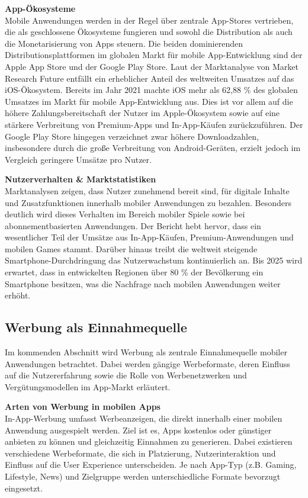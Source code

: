 \textbf{App-Ökosysteme}\\
Mobile Anwendungen werden in der Regel über zentrale App-Stores vertrieben, die als geschlossene Ökosysteme fungieren und sowohl die Distribution als auch die Monetarisierung von Apps steuern. Die beiden dominierenden Distributionsplattformen im globalen Markt für mobile App-Entwicklung sind der Apple App Store und der Google Play Store.
Laut der Marktanalyse von Market Research Future entfällt ein erheblicher Anteil des weltweiten Umsatzes auf das iOS-Ökosystem. Bereits im Jahr 2021 machte iOS mehr als 62,88 \% des globalen Umsatzes im Markt für mobile App-Entwicklung aus. Dies ist vor allem auf die höhere Zahlungsbereitschaft der Nutzer im Apple-Ökosystem sowie auf eine stärkere Verbreitung von Premium-Apps und In-App-Käufen zurückzuführen.
Der Google Play Store hingegen verzeichnet zwar höhere Downloadzahlen, insbesondere durch die große Verbreitung von Android-Geräten, erzielt jedoch im Vergleich geringere Umsätze pro Nutzer. \cite{App_Markt_Entwicklung}

\textbf{Nutzerverhalten \& Marktstatistiken}\\
Marktanalysen zeigen, dass Nutzer zunehmend bereit sind, für digitale Inhalte und Zusatzfunktionen innerhalb mobiler Anwendungen zu bezahlen. Besonders deutlich wird dieses Verhalten im Bereich mobiler Spiele sowie bei abonnementbasierten Anwendungen. Der Bericht hebt hervor, dass ein wesentlicher Teil der Umsätze aus In-App-Käufen, Premium-Anwendungen und mobilen Games stammt.
Darüber hinaus treibt die weltweit steigende Smartphone-Durchdringung das Nutzerwachstum kontinuierlich an. Bis 2025 wird erwartet, dass in entwickelten Regionen über 80 \% der Bevölkerung ein Smartphone besitzen, was die Nachfrage nach mobilen Anwendungen weiter erhöht.\cite{App_Markt_Entwicklung}


\subsection{Werbung als Einnahmequelle}
Im kommenden Abschnitt wird Werbung als zentrale Einnahmequelle mobiler Anwendungen betrachtet. Dabei werden gängige Werbeformate, deren Einfluss auf die Nutzererfahrung sowie die Rolle von Werbenetzwerken und Vergütungsmodellen im App-Markt erläutert.

\textbf{Arten von Werbung in mobilen Apps}\\
In-App-Werbung umfasst Werbeanzeigen, die direkt innerhalb einer mobilen Anwendung ausgespielt werden. Ziel ist es, Apps kostenlos oder günstiger anbieten zu können und gleichzeitig Einnahmen zu generieren. Dabei existieren verschiedene Werbeformate, die sich in Platzierung, Nutzerinteraktion und Einfluss auf die User Experience unterscheiden. Je nach App-Typ (z.B. Gaming, Lifestyle, News) und Zielgruppe werden unterschiedliche Formate bevorzugt eingesetzt.\cite{Werbung_HubSpot}\cite{Werbung_knuguru}

